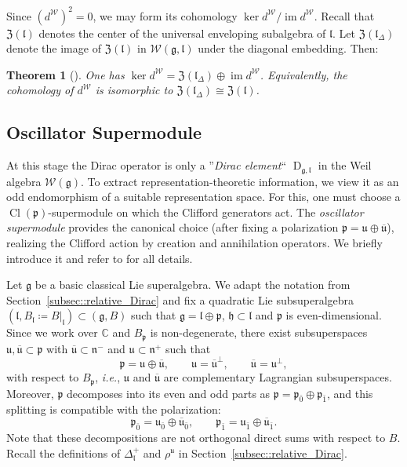 \documentclass[11pt]{amsart}
\renewcommand{\Im}{\operatorname{im}}
\newcommand{\Dirac}{\operatorname{D}}
\def\WW{{\mathcal{W}}}
\def\Weil{{\mathcal{W}(\gg)}}
\def\CC{{\mathbb C}}
\def\ubar{{\overline{\mathfrak{u}}}}
\def\Cl{{\operatorname{Cl}}}
\def\hh{{\mathfrak h}}
\def\pp{{\mathfrak p}}
\def\uu{{\mathfrak u}}
\def\ll{{\mathfrak l}}
\def\pp{{\mathfrak p}}
\def\nn {{\mathfrak{n}}}
\def\pp{{\mathfrak{p}}}
\def\gg{{\mathfrak{g}}}
\theoremstyle{plain}
\newtheorem{theorem}{Theorem}
\theoremstyle{remark}
\theoremstyle{definition}
\numberwithin{equation}{section}
\theoremstyle{remark}
\begin{document}
Since $(d^{\WW})^{2}=0$, we may form its cohomology
$\ker d^{\WW}/\Im d^{\WW}$. Recall that $\mathfrak{Z}(\ll)$ denotes the center of the universal enveloping subalgebra of $\ll$. Let $\mathfrak Z(\ll_{\Delta})$ denote the image of $\mathfrak Z(\ll)$ in $\WW(\gg,\ll)$ under the
diagonal embedding. Then:

\begin{theorem}[{\cite[Theorem~6.2]{Chen_Dirac_quadratic}}]\label{thm::ker_d_center}
One has $\ker d^{\WW}=\mathfrak Z(\ll_{\Delta})\oplus \Im d^{\WW}$. Equivalently, the cohomology of $d^{\WW}$ is
isomorphic to $\mathfrak Z(\ll_{\Delta}) \cong \mathfrak{Z}(\ll)$.
\end{theorem}


\subsection{Oscillator Supermodule} \label{subsec::oscillator_supermodule}

At this stage the Dirac operator is only a ''\!\emph{Dirac element}`` $\Dirac_{\gg,\ll}$ in the Weil algebra
$\Weil$. To extract representation-theoretic information, we view it as an odd endomorphism of a suitable
representation space. For this, one must choose a $\Cl(\mathfrak p)$-supermodule on which the Clifford
generators act. The \emph{oscillator supermodule} provides the canonical choice (after fixing a
polarization $\mathfrak p=\uu\oplus \ubar$), realizing the Clifford action by creation and annihilation
operators. We briefly introduce it and refer to \cite{Schmidt_Noja} for all details.

Let $\gg$ be a basic classical Lie superalgebra. We adapt the notation from Section~\ref{subsec::relative_Dirac} and fix a quadratic Lie subsuperalgebra
$(\ll, B_{\ll}\coloneqq B\vert_{\ll}) \subset (\gg,B)$ such that $\gg=\ll\oplus \pp$, $\hh\subset \ll$ and $\pp$ is even-dimensional. Since we work over $\CC$ and $B_{\pp}$ is non-degenerate,
there exist subsuperspaces $\uu,\ubar\subset \pp$ with $\ubar\subset \nn^{-}$ and $\uu\subset \nn^{+}$ such that
\begin{equation}
\pp=\uu\oplus \ubar,\qquad \uu=\ubar^{\perp},\qquad \ubar=\uu^{\perp},
\end{equation}
with respect to $B_{\pp}$, \emph{i.e.}, $\uu$ and $\ubar$ are complementary Lagrangian subsuperspaces.
Moreover, $\pp$ decomposes into its even and odd parts as $\pp=\pp_{\bar 0}\oplus \pp_{\bar 1}$, and this
splitting is compatible with the polarization:
\begin{equation}
\pp_{\bar 0}=\uu_{\bar 0}\oplus \ubar_{\bar 0},\qquad
\pp_{\bar 1}=\uu_{\bar 1}\oplus \ubar_{\bar 1}.
\end{equation}
Note that these decompositions are not orthogonal direct sums with respect to $B$. Recall the definitions of $\Delta_{\ll}^{+}$ and $\rho^{\uu}$ in Section~\ref{subsec::relative_Dirac}.
\end{document}
